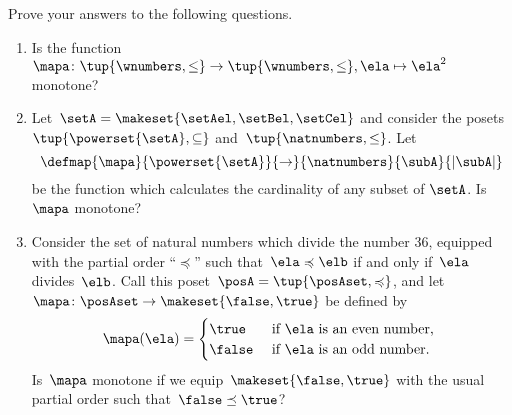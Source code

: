 \clearpage
\vfill
\begin{gradedexercise}
    \label{ex:MonotoneMapCheck}

    Prove your answers to the following questions.
    \begin{enumerate}
        \item Is the function~$\mapa \colon \tup{\wnumbers, \leq} \to \tup{\wnumbers, \leq}, \ela \mapsto \ela^2$ monotone?
        \item Let~$\setA = \makeset{\setAel, \setBel, \setCel}$ and consider the posets~$\tup{\powerset{\setA}, \subseteq}$ and~$\tup{\natnumbers, \leq}$.
              Let
              \begin{equation*}
                  \defmap{\mapa}{\powerset{\setA}}{\to}{\natnumbers}{\subA}{\vert \subA \vert}
              \end{equation*}
              be the function which calculates the cardinality of any subset of $\setA$.
              Is $\mapa$ monotone?
        \item Consider the set of natural numbers which divide the number 36, equipped with the partial order ``$\preccurlyeq$'' such that~$\ela \preccurlyeq \elb$ if and only if~$\ela$ divides~$\elb$.
              Call this poset~$\posA = \tup{\posAset, \preccurlyeq}$, and let~$\mapa \colon \posAset \to \makeset{\false, \true}$ be defined by
              \begin{equation}
                  \mapa(\ela) =
                  \begin{cases}
                      \true  & \text{ if } \ela \text{ is an even number, } \\
                      \false & \text{ if } \ela \text{ is an odd number.
                      }
                  \end{cases}
              \end{equation}
              Is~$\mapa$ monotone if we equip~$\makeset{\false, \true}$ with the usual partial order such that~$\false \preceq \true$?
    \end{enumerate}
\end{gradedexercise}


